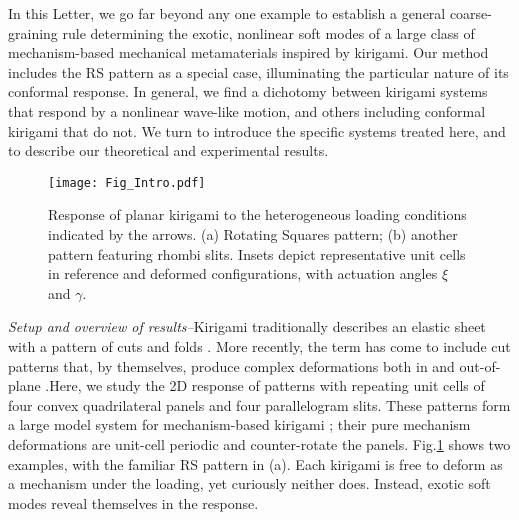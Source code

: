 \documentclass[aps,prl,twocolumn,superscriptaddress]{revtex4-1}
\begin{document}
In this Letter, we go far beyond any one example to establish a general coarse-graining rule determining the exotic, nonlinear soft modes of a large class of mechanism-based mechanical metamaterials inspired by kirigami. Our method includes the RS pattern as a special case, illuminating the particular nature of its conformal response. In general, we find a dichotomy between kirigami systems that respond by a nonlinear wave-like motion, and others including conformal kirigami that do not. We turn to introduce the specific systems treated here, and to describe our theoretical and experimental results. %

\begin{figure}
\centering
\texttt{[image: Fig\_Intro.pdf]}
\caption{Response of planar kirigami to the heterogeneous loading conditions indicated by the arrows. (a) Rotating Squares pattern; (b) another pattern featuring rhombi slits. Insets depict representative unit cells in reference and deformed configurations, with actuation angles $\xi$ and $\gamma$.}
\label{fig:IntroFig}
\end{figure}

\textit{Setup and overview of results\;--}\;Kirigami traditionally describes an elastic sheet with a pattern of cuts and folds \cite{Callens2017, Sussman_PNAS_2015, Wang2017}. More recently, the term has come to include cut patterns that, by themselves, produce complex deformations both in and out-of-plane \cite{ Cho_PNAS_2014, Rafsanjani2016, Tang2017, Blees2015, Rafsanjani2017, Dias_SOFTMATTER_2017, Konakovic2018, Celli2018, Choi2019}.\;Here, we study the 2D response of patterns with  repeating unit cells of four convex quadrilateral panels and four parallelogram slits. These patterns form a large model system for mechanism-based kirigami  \cite{Yang2018geometry, Singh2021,dang2022theorem}; their pure mechanism deformations are unit-cell periodic and counter-rotate the panels. Fig.\;\ref{fig:IntroFig} shows two examples, with the familiar RS pattern in (a). Each kirigami is free to deform as a mechanism under the loading, yet curiously neither does. Instead, exotic soft modes reveal themselves in the response.
\end{document}
